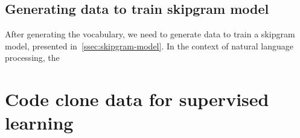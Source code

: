 \subsection{Generating data to train skipgram model}
After generating the vocabulary, we need to generate data to train a skipgram
model, presented in~\ref{ssec:skipgram-model}. In the context of natural
language processing, the
\section{\label{sec:code-clone-data}Code clone data for supervised learning}
